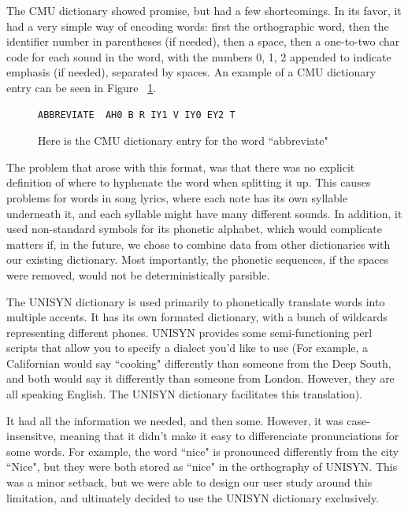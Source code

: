 The CMU dictionary showed promise, but had a few shortcomings.  In its favor, it had a very simple way of encoding words:  first the orthographic word, then the identifier number in parentheses (if needed), then a space, then a one-to-two char code for each sound in the word, with the numbers 0, 1, 2 appended to indicate emphasis (if needed), separated by spaces.  An example of a CMU dictionary entry can be seen in Figure ~\ref{fig:CMUdictAbbreviate}.

\begin{figure}
\begin{center}
\begin{verbatim}
ABBREVIATE  AH0 B R IY1 V IY0 EY2 T
\end{verbatim}
\captionfonts
\caption[CMU dictionary entry example]{Here is the CMU dictionary entry for the word ``abbreviate" }
\label{fig:CMUdictAbbreviate}
\end{center}
\end{figure}




The problem that arose with this format, was that there was no explicit definition of where to hyphenate the word when splitting it up.  This causes problems for words in song lyrics, where each note has its own syllable underneath it, and each syllable might have many different sounds. In addition, it used non-standard symbols for its phonetic alphabet, which would complicate matters if, in the future, we chose to combine data from other dictionaries with our existing dictionary. Most importantly, the phonetic sequences, if the spaces were removed, would not be deterministically parsible. 

The UNISYN dictionary is used primarily to phonetically translate words into multiple accents.  It has its own formated dictionary, with a bunch of wildcards representing different phones.  UNISYN provides some semi-functioning perl scripts that allow you to specify a dialect you’d like to use (For example, a Californian would say ``cooking" differently than someone from the Deep South, and both would say it differently than someone from London.  However, they are all speaking English.  The UNISYN dictionary facilitates this translation).  

It had all the information we needed, and then some.  However, it was case-insensitve, meaning that it didn't make it easy to differenciate pronunciations for some words. For example, the word ``nice" is pronounced differently from the city ``Nice", but they were both stored as ``nice" in the orthography of UNISYN. This was a minor setback, but we were able to design our user study around this limitation, and ultimately decided to use the UNISYN dictionary exclusively.



